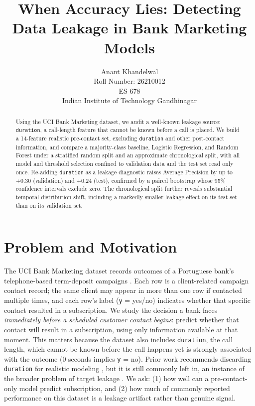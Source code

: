 \documentclass{article}
\title{When Accuracy Lies: Detecting Data Leakage in Bank Marketing Models}
\author{%
  Anant Khandelwal \\
  Roll Number: 26210012 \\
  ES 678 \\
  Indian Institute of Technology Gandhinagar
}
\begin{document}
\maketitle

\begin{abstract}
Using the UCI Bank Marketing dataset, we audit a well-known leakage source:
\texttt{duration}, a call-length feature that cannot be known before a call
is placed. We build a 14-feature realistic pre-contact set, excluding
\texttt{duration} and other post-contact information, and compare a
majority-class baseline, Logistic Regression, and Random Forest under a
stratified random split and an approximate chronological split, with all
model and threshold selection confined to validation data and the test set
read only once. Re-adding \texttt{duration} as a leakage diagnostic raises
Average Precision by up to +0.30 (validation) and +0.24 (test), confirmed by
a paired bootstrap whose 95\% confidence intervals exclude zero. The
chronological split further reveals substantial temporal distribution
shift, including a markedly smaller leakage effect on its test set than on
its validation set.
\end{abstract}

\section{Problem and Motivation}
The UCI Bank Marketing dataset records outcomes of a Portuguese bank's
telephone-based term-deposit campaigns \citep{moro2014data,moro2012uci}. Each
row is a client-related campaign contact record; the same client may appear
in more than one row if contacted multiple times, and each row's label
(\texttt{y} = yes/no) indicates whether that specific contact resulted in a
subscription. We study the decision a bank faces \emph{immediately before a
scheduled customer contact begins}: predict whether that contact will result
in a subscription, using only information available at that moment. This
matters because the dataset also includes \texttt{duration}, the call
length, which cannot be known before the call happens yet is strongly
associated with the outcome (0 seconds implies \texttt{y} = no). Prior work
recommends discarding \texttt{duration} for realistic modeling
\citep{moro2014data}, but it is still commonly left in, an instance of the
broader problem of target leakage \citep{kaufman2012leakage}. We ask: (1)
how well can a pre-contact-only model predict subscription, and (2) how much
of commonly reported performance on this dataset is a leakage artifact
rather than genuine signal.
\end{document}
